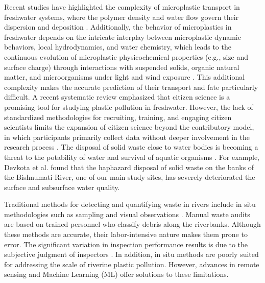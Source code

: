 \documentclass{ieeeaccess}
\begin{document}
Recent studies have highlighted the complexity of microplastic transport in freshwater systems, where the polymer density and water flow govern their dispersion and deposition \cite{stride2024quantifying}. Additionally, the behavior of microplastics in freshwater depends on the intricate interplay between microplastic dynamic behaviors, local hydrodynamics, and water chemistry, which leads to the continuous evolution of microplastic physicochemical properties (e.g., size and surface charge) through interactions with suspended solids, organic natural matter, and microorganisms under light and wind exposure \cite{guo2024microplastics}. This additional complexity makes the accurate prediction of their transport and fate particularly difficult. A recent systematic review emphasized that citizen science is a promising tool for studying plastic pollution in freshwater. However, the lack of standardized methodologies for recruiting, training, and engaging citizen scientists limits the expansion of citizen science beyond the contributory model, in which participants primarily collect data without deeper involvement in the research process \cite{cook2021goals}. The disposal of solid waste close to water bodies is becoming a threat to the potability of water and survival of aquatic organisms \cite{Acholonu2023SolidWD}. For example, Devkota et al. \cite{Devkota2006ImpactOS} found that the haphazard disposal of solid waste on the banks of the Bishnumati River, one of our main study sites, has severely deteriorated the surface and subsurface water quality.

Traditional methods for detecting and quantifying waste in rivers include in situ methodologies such as sampling and visual observations \cite{Emmerik2019PlasticDI, hardesty2017estimating, grosvik2018assessment}. Manual waste audits are based on trained personnel who classify debris along the riverbanks. Although these methods are accurate, their labor-intensive nature makes them prone to error. The significant variation in inspection performance results is due to the subjective judgment of inspectors \cite{10.1007/978-3-031-17629-6_72}. In addition, in situ methods are poorly suited for addressing the scale of riverine plastic pollution. However, advances in remote sensing and Machine Learning (ML) offer solutions to these limitations.
\end{document}
